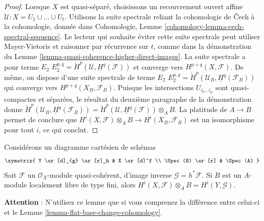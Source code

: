 \begin{proof}
\medskip\noindent
Lorsque $X$ est quasi-séparé, choisissons un recouvrement ouvert affine
$\mathcal{U} : X = U_1 \cup \ldots \cup U_t$. Utilisons la
suite spectrale reliant la cohomologie de {\v C}ech à la cohomologie, donnée dans
Cohomologie, Lemme \ref{cohomology-lemma-cech-spectral-sequence}.
Le lecteur qui souhaite éviter cette suite spectrale
peut utiliser Mayer-Vietoris et raisonner par récurrence sur $t$, comme dans la démonstration du
Lemme \ref{lemma-quasi-coherence-higher-direct-images}.
La suite spectrale a pour terme $E_2$
$E_2^{p, q} = \check{H}^p(\mathcal{U}, \underline{H}^q(\mathcal{F}))$
et converge vers $H^{p + q}(X, \mathcal{F})$.
De même, on dispose d'une suite spectrale de terme $E_2$
$E_2^{p, q} = \check{H}^p(\mathcal{U}_B, \underline{H}^q(\mathcal{F}_B))$
qui converge vers $H^{p + q}(X_B, \mathcal{F}_B)$.
Puisque les intersections $U_{i_0 \ldots i_p}$ sont quasi-compactes
et séparées, le résultat du deuxième paragraphe de la démonstration donne
$\check{H}^p(\mathcal{U}_B, \underline{H}^q(\mathcal{F}_B)) =
\check{H}^p(\mathcal{U}, \underline{H}^q(\mathcal{F})) \otimes_A B$.
La platitude de $A \to B$ permet de conclure que
$H^i(X, \mathcal{F}) \otimes_A B \to H^i(X_B, \mathcal{F}_B)$
est un isomorphisme pour tout $i$, ce qui conclut.
\end{proof}

\begin{lemma}
\label{lemma-finite-locally-free-base-change-cohomology}
Considérons un diagramme cartésien de schémas
$$
\xymatrix{
Y \ar[d]_{g} \ar[r]_h & X \ar[d]^f \\
\Spec(B) \ar[r] & \Spec(A)
}
$$
Soit $\mathcal{F}$ un $\mathcal{O}_X$-module quasi-cohérent,
d'image inverse $\mathcal{G} = h^*\mathcal{F}$.
Si $B$ est un $A$-module localement libre de type fini, alors
$H^i(X, \mathcal{F}) \otimes_A B = H^i(Y, \mathcal{G})$.
\end{lemma}

\noindent
{\bf Attention} : N'utilisez ce lemme que si vous comprenez la différence
entre celui-ci et le Lemme \ref{lemma-flat-base-change-cohomology}.

